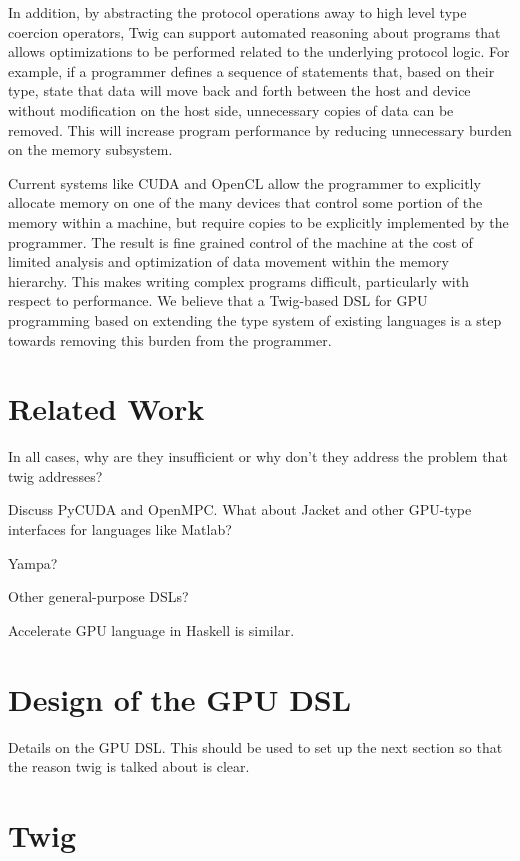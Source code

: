 \documentclass[11pt]{article}
\begin{document}
In addition, by abstracting the protocol operations away to high level
type coercion operators, Twig can support automated reasoning about
programs that allows optimizations to be performed related to the underlying
protocol logic.  For example, if a programmer defines a sequence of
statements that, based on their type, state that data will move back and forth
between the host and device without modification on the host side, unnecessary
copies of data can be removed.  This will increase program performance by
reducing unnecessary burden on the memory subsystem.

Current systems like CUDA and OpenCL allow the programmer to explicitly
allocate memory on one of the many devices that control some portion of 
the memory within a machine, but require copies to be explicitly implemented
by the programmer.  The result is fine grained control of the machine at the
cost of limited analysis and optimization of data movement within the memory
hierarchy.  This makes writing complex programs difficult, particularly with
respect to performance.  We believe that a Twig-based DSL for GPU programming
based on extending the type system of existing languages is a step towards
removing this burden from the programmer.

\section{Related Work}

In all cases, why are they insufficient or why don't they address the
problem that twig addresses?

Discuss PyCUDA and OpenMPC. What about Jacket and other GPU-type interfaces
for languages like Matlab?

Yampa?

Other general-purpose DSLs?

Accelerate GPU language in Haskell is similar.  

\section{Design of the GPU DSL}

Details on the GPU DSL.  This should be used to set up the next section so
that the reason twig is talked about is clear.

\section{Twig}
\end{document}
